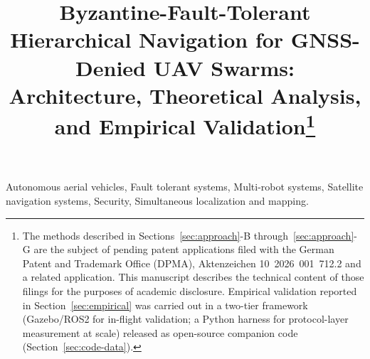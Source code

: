 \documentclass[journal,10pt,twocolumn]{IEEEtran}
\begin{document}
\pagestyle{plain}

\title{Byzantine-Fault-Tolerant Hierarchical Navigation for GNSS-Denied UAV Swarms: Architecture, Theoretical Analysis, and Empirical Validation\thanks{The methods described in Sections~\ref{sec:approach}-B through~\ref{sec:approach}-G are the subject of pending patent applications filed with the German Patent and Trademark Office (DPMA), Aktenzeichen 10~2026~001~712.2 and a related application. This manuscript describes the technical content of those filings for the purposes of academic disclosure. Empirical validation reported in Section~\ref{sec:empirical} was carried out in a two-tier framework (Gazebo/ROS2 for in-flight validation; a Python harness for protocol-layer measurement at scale) released as open-source companion code (Section~\ref{sec:code-data}).}}

\author{
}

\maketitle

\begin{IEEEkeywords}
Autonomous aerial vehicles, Fault tolerant systems, Multi-robot systems, Satellite navigation systems, Security, Simultaneous localization and mapping.
\end{IEEEkeywords}
\end{document}
